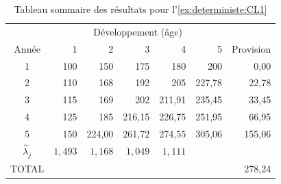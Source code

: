 \begin{exemple}
  \begin{table}
    \centering
    \caption{Tableau sommaire des résultats pour
      l'\autoref{ex:deterministe:CL1}}
    \label{tab:deterministe:CL1:resultats}
    \begin{tabular}{crrrrrr}
      \toprule
      & \multicolumn{5}{c}{Développement (âge)} \\
      Année & 1 & 2 & 3 & 4 & 5 & Provision \\
      \midrule
      1 & 100 & 150    & 175    & 180    & 200    &   0,00 \\
      2 & 110 & 168    & 192    & 205    & 227,78 &  22,78 \\
      3 & 115 & 169    & 202    & 211,91 & 235,45 &  33,45 \\
      4 & 125 & 185    & 216,15 & 226,75 & 251,95 &  66,95 \\
      5 & 150 & 224,00 & 261,72 & 274,55 & 305,06 & 155,06 \\
      \midrule
      $\hat{\lambda}_j$ & $1,493$ & $1,168$ & $1,049$ & $1,111$ \\
      \midrule
      TOTAL & & & & & & 278,24 \\
      \bottomrule
    \end{tabular}
  \end{table}
\end{exemple}

